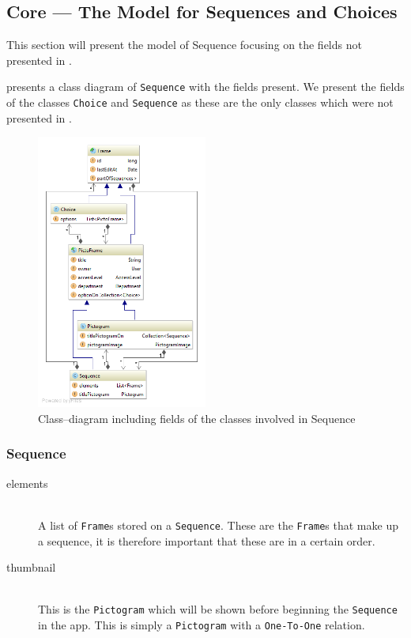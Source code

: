 \subsection{Core --- The Model for Sequences and Choices}\label{subsec:seqcore}
This section will present the model of Sequence focusing on the fields not presented in .

 presents a class diagram of \texttt{Sequence} with the fields present.
We present the fields of the classes \texttt{Choice} and \texttt{Sequence} as these are the only classes which were not presented in .

\begin{figure}[h]
    \centering
    \includegraphics[width=0.5\textwidth]{figures/diagram-sequence-with-fields.png}
    \caption{Class--diagram including fields of the classes involved in Sequence}\label{fig:sequencemodel}
\end{figure}

\subsubsection{Sequence}
\begin{description}
	\item[elements] \hfill \\
    A list of \texttt{Frame}s stored on a \texttt{Sequence}.
	These are the \texttt{Frame}s that make up a sequence, it is therefore important that these are in a certain order.
	\item[thumbnail] \hfill \\
    This is the \texttt{Pictogram} which will be shown before beginning the \texttt{Sequence} in the app.
	This is simply a \texttt{Pictogram} with a \texttt{One-To-One} relation.
\end{description}

